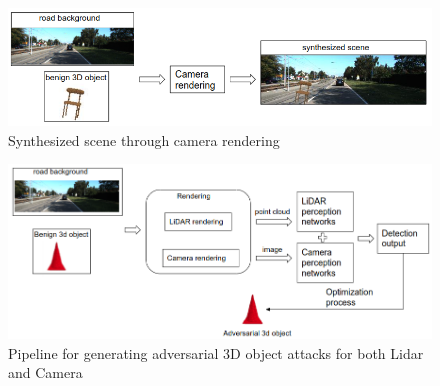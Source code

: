 \begin{figure}
	\centering
	\includegraphics[width=0.8\linewidth]{figure/synthesized.png}
	\caption{Synthesized scene through camera rendering}
	\label{fig:synthe}
\end{figure}

\begin{figure}
	\centering
	\includegraphics[width=0.8\linewidth]{figure/attack-pipeline.png}
	\caption{Pipeline for generating adversarial 3D object attacks for both Lidar and Camera}
	\label{fig:attack-pipe}
\end{figure}

